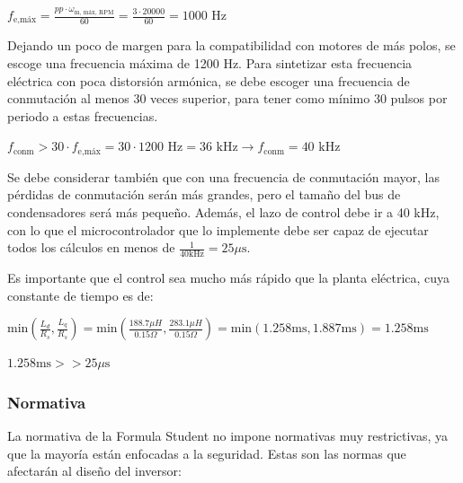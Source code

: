 \(f_{\text{e,máx}} = \frac{pp\cdot \omega_{\text{m, máx, RPM}}}{60} = \frac{3\cdot 20000}{60} = 1000 \text{ Hz}\)

Dejando un poco de margen para la compatibilidad con motores de más polos, se escoge una frecuencia máxima de 1200 Hz. Para sintetizar esta frecuencia eléctrica con poca distorsión armónica, se debe escoger una frecuencia de conmutación al menos 30 veces superior, para tener como mínimo 30 pulsos por periodo a estas frecuencias.

\(f_{\text{conm}} > 30\cdot f_{\text{e,máx}} = 30\cdot1200 \text{ Hz} = 36 \text{ kHz} \rightarrow f_{\text{conm}} = 40 \text{ kHz}\)

Se debe considerar también que con una frecuencia de conmutación mayor, las pérdidas de conmutación serán más grandes, pero el tamaño del bus de condensadores será más pequeño. Además, el lazo de control debe ir a 40 kHz, con lo que el microcontrolador que lo implemente debe ser capaz de ejecutar todos los cálculos en menos de $\frac{1}{40 \text{kHz}} = 25 \mu\text{s}$.

Es importante que el control sea mucho más rápido que la planta eléctrica, cuya constante de tiempo es de:

\(\text{min}(\frac{L_d}{R_s},\frac{L_q}{R_s}) = \text{min}(\frac{188.7 \mu H}{0.15 \Omega},\frac{283.1 \mu H}{0.15 \Omega}) = \text{min}(1.258 \text{ms}, 1.887 \text{ms}) = 1.258 \text{ms}\)

\(1.258 \text{ms} >> 25 \mu\text{s}\)

\subsubsection{Normativa}
La normativa de la Formula Student no impone normativas muy restrictivas, ya que la mayoría están enfocadas a la seguridad. Estas son las normas que afectarán al diseño del inversor:

